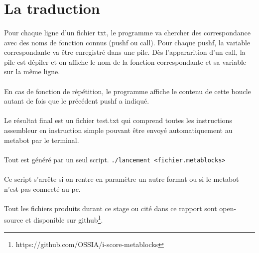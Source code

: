 \documentclass[10pt,a4paper]{report}
\begin{document}
\paragraph{}
\section{La traduction}
\paragraph{}
Pour chaque ligne d'un fichier txt, le programme va chercher des correspondance avec des noms de fonction connus (pushf ou call). Pour chaque pushf, la variable correspondante va être enregistré dans une pile. Dès l'appararition d'un call, la pile est dépiler et on affiche le nom de la fonction correspondante et sa variable sur la même ligne.
\paragraph{}
En cas de fonction de répétition, le programme affiche le contenu de cette boucle autant de fois que le précédent pushf a indiqué.
\paragraph{}
Le résultat final est un fichier test.txt qui comprend toutes les instructions assembleur en instruction simple pouvant être envoyé automatiquement au metabot par le terminal.
\paragraph{}
Tout est généré par un seul script.
\texttt{./lancement <fichier.metablocks>}
\paragraph{}
Ce script s'arrête si on rentre en paramètre un autre format ou si le metabot n'est pas connecté au pc.
\paragraph{}
Tout les fichiers produits durant ce stage ou cité dans ce rapport sont open-source et disponible sur github\footnote{https://github.com/OSSIA/i-score-metablocks}.
\end{document}
